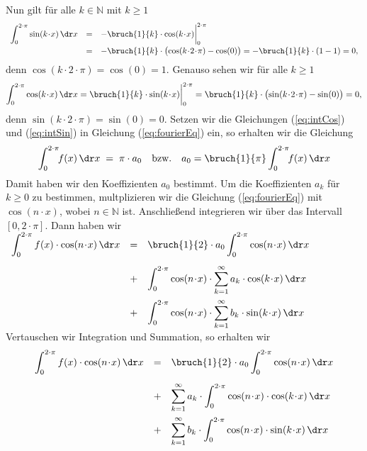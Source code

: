 Nun gilt f\"ur alle $k\in\mathbb{N}$ mit $k\geq 1$
\begin{equation}
  \label{eq:intSin}
  \begin{array}[t]{lcl}    
  \displaystyle \int_0^{2\cdot\pi} \sin(k\!\cdot\!x)\,\dr x & = &
 -\bruch{1}{k}\cdot\cos(k\!\cdot\!x) \bigg|_0^{2\cdot\pi} \\[0.3cm]
& = &
 -\bruch{1}{k}\cdot\bigl(\cos(k\!\cdot\!2\!\cdot\!\pi) - \cos(0)\bigr) = 
 -\bruch{1}{k}\cdot(1 - 1) = 0,
  \end{array}
\end{equation}
denn $\cos(k\!\cdot\!2\!\cdot\!\pi) = \cos(0) = 1$. Genauso sehen wir f\"ur alle $k\geq 1$
\begin{equation}
  \label{eq:intCos}
  \int_0^{2\cdot\pi} \cos(k\!\cdot\!x)\,\dr x = 
 \bruch{1}{k}\cdot\sin(k\!\cdot\!x) \bigg|_0^{2\cdot\pi} = 
 \bruch{1}{k}\cdot\bigl(\sin(k\!\cdot\!2\!\cdot\!\pi) - \sin(0)\bigr) = 0,
\end{equation}
denn $\sin(k\!\cdot\!2\!\cdot\!\pi) = \sin(0) = 0$.
Setzen wir die Gleichungen (\ref{eq:intCos}) und (\ref{eq:intSin}) in Gleichung
(\ref{eq:fourierEq}) ein, so erhalten wir die Gleichung
\begin{equation}
  \label{eq:fourierA0}
\int_0^{2\cdot\pi}\!\!f(x)\,\dr x \; = \; \pi\cdot a_0 \quad \mbox{bzw.}\quad a_0 = \bruch{1}{\pi}\int_0^{2\cdot\pi}\!\!f(x)\,\dr x
\end{equation}
Damit haben wir  den Koeffizienten $a_0$ bestimmt.  Um die Koeffizienten 
$a_k$ f\"ur $k\geq 0$ zu bestimmen, 
multplizieren wir die Gleichung (\ref{eq:fourierEq}) mit $\cos(n\!\cdot\!x)$, wobei
$n\in\mathbb{N}$ ist.  Anschlie{\ss}end integrieren wir  \"uber das
Intervall $[0,2\!\cdot\!\pi]$.  Dann haben wir
\\[0.3cm]
\hspace*{0.8cm}
$
\begin{array}[t]{lcl}
\displaystyle \int_0^{2\cdot\pi}f(x)\cdot\cos(n\!\cdot\!x)\,\dr x 
& = & \displaystyle \bruch{1}{2}\cdot a_0  \int_0^{2\cdot\pi} \cos(n\!\cdot\!x)\,\dr x  \\[0.5cm]
& + & \displaystyle \int_0^{2\cdot\pi} \cos(n\!\cdot\!x)\cdot\sum\limits_{k=1}^\infty a_k\cdot \cos(k\!\cdot\!x) \,\dr x \\[0.5cm]
& + & \displaystyle \int_0^{2\cdot\pi} \cos(n\!\cdot\!x)\cdot\sum\limits_{k=1}^\infty b_k\cdot \sin(k\!\cdot\!x) \,\dr x 
\end{array}
$
\\[0.3cm]
Vertauschen wir Integration und Summation, so erhalten wir
\begin{equation}
  \label{eq:fourierAk1}
\begin{array}[b]{lcl}
\displaystyle \int_0^{2\cdot\pi}f(x)\cdot\cos(n\!\cdot\!x)\,\dr x 
& = & \displaystyle \bruch{1}{2}\cdot a_0  \int_0^{2\cdot\pi} \cos(n\!\cdot\!x)\,\dr x  \\[0.5cm]
& + & \displaystyle \sum\limits_{k=1}^\infty a_k\cdot \int_0^{2\cdot\pi} \cos(n\!\cdot\!x)\cdot\cos(k\!\cdot\!x) \,\dr x \\[0.5cm]
& + & \displaystyle \sum\limits_{k=1}^\infty b_k\cdot \int_0^{2\cdot\pi} \cos(n\!\cdot\!x)\cdot\sin(k\!\cdot\!x) \,\dr x 
\end{array}  
\end{equation}
